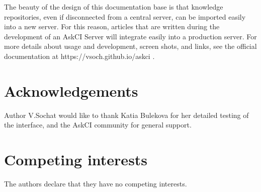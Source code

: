 \documentclass{jors}
\begin{document}
The beauty of the design of this documentation base is that knowledge repositories, even if disconnected from
a central server, can be imported easily into a new server. For this reason, articles that are written during the development
of an AskCI Server will integrate easily into a production server. For more details about usage and development, screen shots, and
links, see the official documentation at https://vsoch.github.io/askci \cite{askci-server}.


\section*{Acknowledgements}

Author V.Sochat would like to thank Katia Bulekova for her detailed testing of the interface, and the AskCI community for general support.

\section*{Competing interests}
The authors declare that they have no competing interests.

\newpage
\thispagestyle{empty} 



\vspace{2cm}
\end{document}
